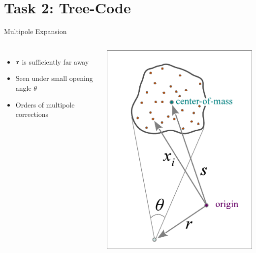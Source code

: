 \section{Task 2: Tree-Code}

\begin{frame}{Multipole Expansion}
	\begin{columns}
		\begin{itemize}
			\item $\vb{r}$ is sufficiently far
			      away
			\item  Seen under small opening angle
			      $\theta$
			\item  Orders of multipole corrections
		\end{itemize}
		\includegraphics[width=\linewidth]{figures/multipole.png}
	\end{columns}
\end{frame}

